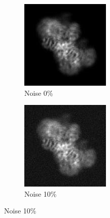 \documentclass[twoside]{iitbreport}
\begin{document}
\begin{figure}[h]
\centering

\begin{subfigure}{.3\textwidth}
\centering
\includegraphics[width=0.8\linewidth]{Emd_4138_proj_1.jpg}
\captionsetup{justification=centering}
\caption{ Noise 0\% }
\end{subfigure} 
\begin{subfigure}{.27\textwidth}
\centering
\includegraphics[width=0.8\linewidth]{Emd_4138_proj1_noise_10.jpg}
\captionsetup{justification=centering}
\caption{ Noise 10\%}
\end{subfigure}

\end{figure}
\end{document}
